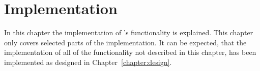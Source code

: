 \chapter{Implementation}
In this chapter the implementation of \projectname{}'s functionality is explained.
This chapter only covers selected parts of the implementation. %
It can be expected, that the implementation of all of the functionality not described in this chapter, has been implemented as designed in Chapter~\ref{chapter:design}.



